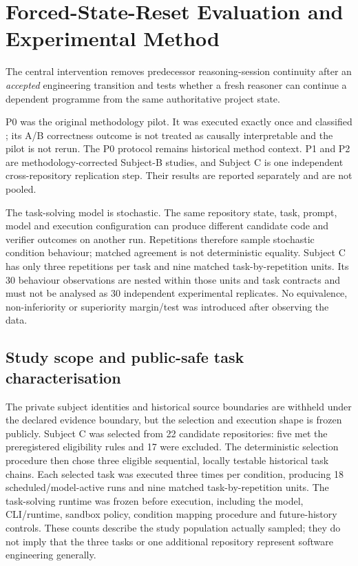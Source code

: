 \section{Forced-State-Reset Evaluation and Experimental Method}
\label{sec:method}

The central intervention removes predecessor reasoning-session continuity after an \emph{accepted} engineering transition and tests whether a fresh reasoner can continue a dependent programme from the same authoritative project state.

P0 was the original methodology pilot. It was executed exactly once and classified \mixedstatus; its A/B correctness outcome is not treated as causally interpretable and the pilot is not rerun. The P0 protocol remains historical method context. P1 and P2 are methodology-corrected Subject-B studies, and Subject C is one independent cross-repository replication step. Their results are reported separately and are not pooled.

The task-solving model is stochastic. The same repository state, task, prompt, model and execution configuration can produce different candidate code and verifier outcomes on another run. Repetitions therefore sample stochastic condition behaviour; matched agreement is not deterministic equality. Subject C has only three repetitions per task and nine matched task-by-repetition units. Its 30 behaviour observations are nested within those units and task contracts and must not be analysed as 30 independent experimental replicates. No equivalence, non-inferiority or superiority margin/test was introduced after observing the data.

\subsection{Study scope and public-safe task characterisation}

The private subject identities and historical source boundaries are withheld under the declared evidence boundary, but the selection and execution shape is frozen publicly. Subject C was selected from 22 candidate repositories: five met the preregistered eligibility rules and 17 were excluded. The deterministic selection procedure then chose three eligible sequential, locally testable historical task chains. Each selected task was executed three times per condition, producing 18 scheduled/model-active runs and nine matched task-by-repetition units. The task-solving runtime was frozen before execution, including the model, CLI/runtime, sandbox policy, condition mapping procedure and future-history controls. These counts describe the study population actually sampled; they do not imply that the three tasks or one additional repository represent software engineering generally.

